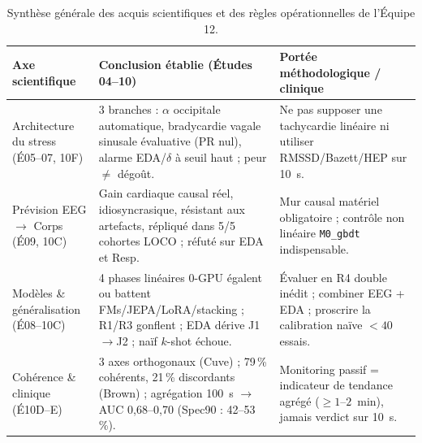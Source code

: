 \documentclass[10pt]{article}
\begin{document}
\begin{table}[t]
\centering\footnotesize
\begin{tabularx}{\linewidth}{@{}L{2.5cm} Y L{4.7cm}@{}}
\toprule
Axe scientifique & Conclusion établie (Études 04--10) & Portée méthodologique / clinique\\
\midrule
Architecture du stress (É05--07, 10F) & 3 branches : $\alpha$ occipitale automatique, bradycardie vagale sinusale évaluative (PR nul), alarme EDA/$\delta$ à seuil haut ; peur $\neq$ dégoût. & Ne pas supposer une tachycardie linéaire ni utiliser RMSSD/Bazett/HEP sur 10~s.\\
Prévision EEG $\to$ Corps (É09, 10C) & Gain cardiaque causal réel, idiosyncrasique, résistant aux artefacts, répliqué dans 5/5 cohortes LOCO ; réfuté sur EDA et Resp. & Mur causal matériel obligatoire ; contrôle non linéaire \texttt{M0\_gbdt} indispensable.\\
Modèles \& généralisation (É08--10C) & 4 phases linéaires 0-GPU égalent ou battent FMs/JEPA/LoRA/stacking ; R1/R3 gonflent ; EDA dérive J1$\to$J2 ; naïf $k$-shot échoue. & Évaluer en R4 double inédit ; combiner EEG + EDA ; proscrire la calibration naïve $<40$ essais.\\
Cohérence \& clinique (É10D--E) & 3 axes orthogonaux (Cuve) ; 79\,\% cohérents, 21\,\% discordants (Brown) ; agrégation 100~s $\to$ AUC 0,68--0,70 (Spec90 : 42--53\,\%). & Monitoring passif = indicateur de tendance agrégé ($\ge 1$--$2$~min), jamais verdict sur 10~s.\\
\bottomrule
\end{tabularx}
\caption{Synthèse générale des acquis scientifiques et des règles opérationnelles de l'Équipe 12.}
\label{tab:final_synthesis}
\end{table}
\end{document}
